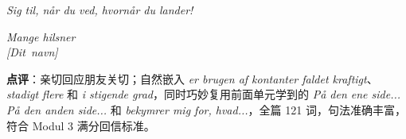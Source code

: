 \begin{answerbox}
\textit{Sig til, når du ved, hvornår du lander!}

\textit{Mange hilsner\\
\mbox{[Dit navn]}}

\small\textbf{点评}：亲切回应朋友关切；自然嵌入 \textit{er brugen af kontanter faldet kraftigt}、\textit{stadigt flere} 和 \textit{i stigende grad}，同时巧妙复用前面单元学到的 \textit{På den ene side... På den anden side...} 和 \textit{bekymrer mig for, hvad...}，全篇 121 词，句法准确丰富，符合 Modul 3 满分回信标准。
\end{answerbox}